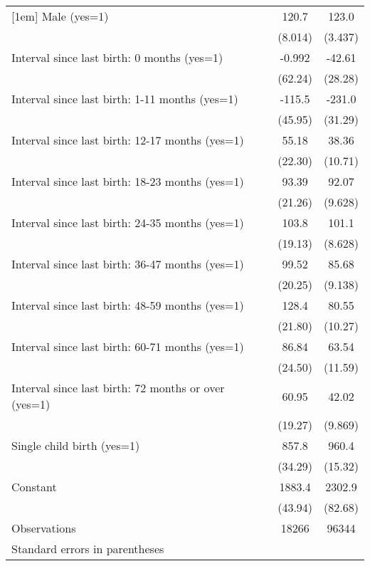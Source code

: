 \begin{tabular}{l*{2}{c}}
[1em]
Male (yes=1)        &       120.7&       123.0\\
                    &     (8.014)&     (3.437)\\
[1em]
Interval since last birth: 0 months (yes=1)&      -0.992&      -42.61\\
                    &     (62.24)&     (28.28)\\
[1em]
Interval since last birth: 1-11 months (yes=1)&      -115.5&      -231.0\\
                    &     (45.95)&     (31.29)\\
[1em]
Interval since last birth: 12-17 months (yes=1)&       55.18&       38.36\\
                    &     (22.30)&     (10.71)\\
[1em]
Interval since last birth: 18-23 months (yes=1)&       93.39&       92.07\\
                    &     (21.26)&     (9.628)\\
[1em]
Interval since last birth: 24-35 months (yes=1)&       103.8&       101.1\\
                    &     (19.13)&     (8.628)\\
[1em]
Interval since last birth: 36-47 months (yes=1)&       99.52&       85.68\\
                    &     (20.25)&     (9.138)\\
[1em]
Interval since last birth: 48-59 months (yes=1)&       128.4&       80.55\\
                    &     (21.80)&     (10.27)\\
[1em]
Interval since last birth: 60-71 months (yes=1)&       86.84&       63.54\\
                    &     (24.50)&     (11.59)\\
[1em]
Interval since last birth: 72 months or over (yes=1)&       60.95&       42.02\\
                    &     (19.27)&     (9.869)\\
[1em]
Single child birth (yes=1)&       857.8&       960.4\\
                    &     (34.29)&     (15.32)\\
[1em]
Constant            &      1883.4&      2302.9\\
                    &     (43.94)&     (82.68)\\
\hline
Observations        &       18266&       96344\\
\hline\hline
\multicolumn{3}{l}{\footnotesize Standard errors in parentheses}\\
\end{tabular}
